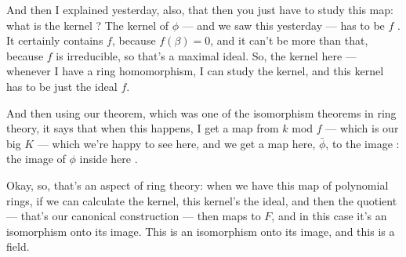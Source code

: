 \begin{speech}[00:14:17 - 00:15:54]
And then I explained yesterday, also, that then you just have to study this map: what is the kernel ? The kernel of $\phi$ --- and we saw this yesterday --- has to be $f$ . It certainly contains $f$, because $f(\beta) = 0$, and it can't be more than that, because $f$ is irreducible, so that's a maximal ideal. So, the kernel here  --- whenever I have a ring homomorphism, I can study the kernel, and this kernel has to be just the ideal $f$.

And then using our theorem, which was one of the isomorphism theorems in ring theory, it says that when this happens, I get a map from $k$ mod $f$ --- which is our big $K$  --- which we're happy to see here, and we get a map here, $\bar{\phi}$, to the image : the image of $\phi$ inside here .

Okay, so, that's an aspect of ring theory: when we have this map of polynomial rings, if we can calculate the kernel, this kernel's the ideal, and then the quotient --- that's our canonical construction --- then maps to $F$, and in this case it's an isomorphism onto its image. This is an isomorphism onto its image, and this is a field.
\end{speech}

